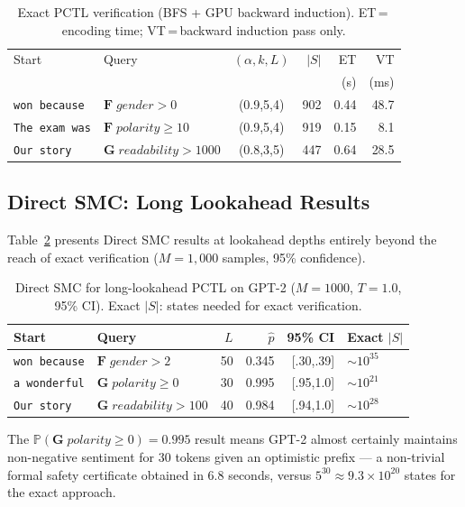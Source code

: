 \documentclass{article}
\newcommand{\Prob}{\mathbb{P}}
\begin{document}
\begin{table}[tb]
\centering
\small
\caption{Exact PCTL verification (BFS + GPU backward induction).
ET\,=\,encoding time; VT\,=\,backward induction pass only.}
\label{tab:exact}
\begin{tabular}{p{1.4cm}p{2.0cm}crrr}
\toprule
Start & Query & $(\alpha,k,L)$ & $|S|$ & ET & VT \\
 & & & & (s) & (ms) \\
\midrule
\texttt{won because}
  & $\mathbf{F}\;\textit{gender}{>}0$    & (0.9,5,4) & 902 & 0.44 & 48.7 \\
\texttt{The exam was}
  & $\mathbf{F}\;\textit{polarity}{\ge}10$ & (0.9,5,4) & 919 & 0.15 &  8.1 \\
\texttt{Our story}
  & $\mathbf{G}\;\textit{readability}{>}1000$ & (0.8,3,5) & 447 & 0.64 & 28.5 \\
\bottomrule
\end{tabular}
\end{table}

\subsection{Direct SMC: Long Lookahead Results}

Table~\ref{tab:dsmc} presents Direct SMC results at lookahead depths entirely
beyond the reach of exact verification ($M{=}1{,}000$ samples, 95\% confidence).

\begin{table}[tb]
\centering
\small
\caption{Direct SMC for long-lookahead PCTL on GPT-2 ($M{=}1000$, $T{=}1.0$,
95\% CI). Exact $|S|$: states needed for exact verification.}
\label{tab:dsmc}
\begin{tabular}{p{1.3cm}p{1.8cm}rrrl}
\toprule
Start & Query & $L$ & $\hat{p}$ & 95\% CI & Exact $|S|$ \\
\midrule
\texttt{won because}
  & $\mathbf{F}\;\textit{gender}{>}2$
  & 50 & 0.345 & [.30,.39] & ${\sim}10^{35}$ \\
\texttt{a wonderful}
  & $\mathbf{G}\;\textit{polarity}{\ge}0$
  & 30 & 0.995 & [.95,1.0] & ${\sim}10^{21}$ \\
\texttt{Our story}
  & $\mathbf{G}\;\textit{readability}{>}100$
  & 40 & 0.984 & [.94,1.0] & ${\sim}10^{28}$ \\
\bottomrule
\end{tabular}
\end{table}

The $\Prob(\mathbf{G}\;\textit{polarity}{\ge}0) = 0.995$ result means GPT-2 almost
certainly maintains non-negative sentiment for 30 tokens given an optimistic
prefix — a non-trivial formal safety certificate obtained in 6.8 seconds,
versus $5^{30} \approx 9.3 \times 10^{20}$ states for the exact approach.
\end{document}

